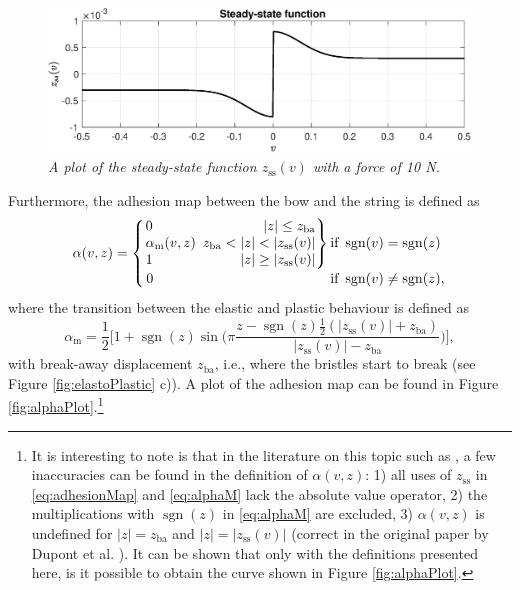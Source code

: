 \documentclass[twoside,a4paper,dvipsnames]{article}
\newenvironment{rcases}
  {\left.\begin{alignedat}{2}}
  {\end{alignedat}\right\rbrace}
\DeclareMathOperator{\sgn}{sgn}
\begin{document}
\begin{figure}[ht]
\centerline{\includegraphics[width=1.0\columnwidth]{steadyState.eps}}
\caption{\label{fig:zss}{\it A plot of the steady-state function $z_\text{ss}(v)$ with a force of 10 N.}}
\end{figure}
Furthermore, the adhesion map between the bow and the string is defined as
\begin{equation}\label{eq:adhesionMap}
\alpha(v, z) = 
\begin{aligned}
    \begin{cases}
    \begin{rcases}
        &0 & |z| \leq z_\text{ba}\\
       &\alpha_\text{m}(v,z)&\ \, z_\text{ba}<|z|<|z_\text{ss}(v)|\\        &1 &|z|\geq|z_\text{ss}(v)|
        \end{rcases} 
        
        &\!\!\!\!\!\text{if}\  \sgn(v)=\sgn(z)\\
        \,0&\!\!\!\!\!\text{if}\  \sgn(v)\neq\sgn(z),
    \end{cases}
    \end{aligned}
\end{equation}
where the transition between the elastic and plastic behaviour is defined as
\begin{equation}\label{eq:alphaM}
    \alpha_\text{m} = \frac{1}{2}\bigg[1+\sgn(z)\sin\bigg(\pi\frac{z-\sgn(z)\frac{1}{2}(|z_\text{ss}(v)|+z_\text{ba})}{|z_\text{ss}(v)|-z_\text{ba}}\bigg)\bigg],
\end{equation}
with break-away displacement $z_\text{ba}$, i.e., where the bristles start to break (see Figure \ref{fig:elastoPlastic} c)). A plot of the adhesion map can be found in Figure \ref{fig:alphaPlot}.\footnote{It is interesting to note is that in the literature on this topic such as \cite{Dupont2002, Serafin2003, Serafin2004, Avanzini2005}, a few inaccuracies can be found in the definition of $\alpha(v,z)$: 1) all uses of $z_\text{ss}$ in \eqref{eq:adhesionMap} and \eqref{eq:alphaM} lack the absolute value operator, 2) the multiplications with $\sgn(z)$ in \eqref{eq:alphaM} are excluded, 3) $\alpha(v,z)$ is undefined for $|z|=z_\text{ba}$ and $|z|=|z_\text{ss}(v)|$ (correct in the original paper by Dupont et al. \cite{Dupont2002}). It can be shown that only with the definitions presented here, is it possible to obtain the curve shown in Figure \ref{fig:alphaPlot}.}
\end{document}
